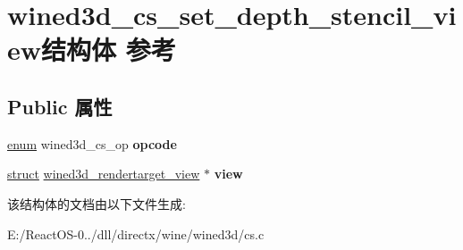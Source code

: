 \hypertarget{structwined3d__cs__set__depth__stencil__view}{}\section{wined3d\+\_\+cs\+\_\+set\+\_\+depth\+\_\+stencil\+\_\+view结构体 参考}
\label{structwined3d__cs__set__depth__stencil__view}
\subsection*{Public 属性}
\begin{DoxyCompactItemize}
\item 
\mbox{\label{structwined3d__cs__set__depth__stencil__view_a98c197380b393df9f9d613b5822f8499}} 
\hyperlink{interfaceenum}{enum} wined3d\+\_\+cs\+\_\+op {\bfseries opcode}
\item 
\mbox{\label{structwined3d__cs__set__depth__stencil__view_a90b2d4a29c1372633380803642285e58}} 
\hyperlink{interfacestruct}{struct} \hyperlink{structwined3d__rendertarget__view}{wined3d\+\_\+rendertarget\+\_\+view} $\ast$ {\bfseries view}
\end{DoxyCompactItemize}


该结构体的文档由以下文件生成\+:\begin{DoxyCompactItemize}
\item 
E\+:/\+React\+O\+S-\/0../dll/directx/wine/wined3d/cs.\+c\end{DoxyCompactItemize}
